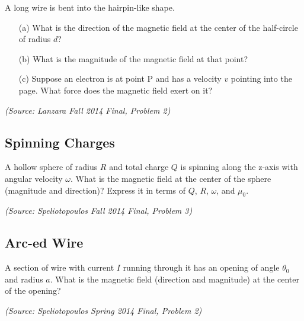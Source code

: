\documentclass{article}
\begin{document}
A long wire is bent into the hairpin-like shape.
\begin{itemize}
\item[(a)] What is the direction of the magnetic field at the center of the half-circle of radius $d$?
\item[(b)] What is the magnitude of the magnetic field at that point?
\item[(c)] Suppose an electron is at point P and has a velocity $v$ pointing into the page. What force does the magnetic field exert on it?
\end{itemize}

\textit{(Source: Lanzara Fall 2014 Final, Problem 2)}

\subsection{Spinning Charges}

A hollow sphere of radius $R$ and total charge $Q$ is spinning along the z-axis with angular velocity $\omega$. What is the magnetic field at the center of the sphere (magnitude and direction)? Express it in terms of $Q$, $R$, $\omega$, and $\mu_0$.

\textit{(Source: Speliotopoulos Fall 2014 Final, Problem 3)}

\subsection{Arc-ed Wire}

A section of wire with current $I$ running through it has an opening of angle $\theta_0$ and radius $a$. What is the magnetic field (direction and magnitude) at the center of the opening?

\textit{(Source: Speliotopoulos Spring 2014 Final, Problem 2)}
\end{document}
